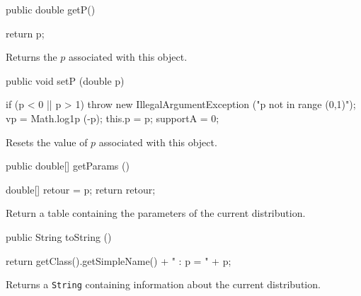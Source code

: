 \begin{code}

   public double getP()\begin{hide} {
      return p;
   }\end{hide}
\end{code}
\begin{tabb}
   Returns the $p$ associated with this object.
\end{tabb}
\begin{code}

   public void setP (double p)\begin{hide} {
      if (p < 0 || p > 1)
         throw new IllegalArgumentException ("p not in range (0,1)");
      vp = Math.log1p (-p);
      this.p = p;
      supportA = 0;
   }\end{hide}
\end{code}
\begin{tabb}
   Resets the value of $p$ associated with this object.
\end{tabb}
\begin{code}

   public double[] getParams ()\begin{hide} {
      double[] retour = {p};
      return retour;
   }\end{hide}
\end{code}
\begin{tabb}
   Return a table containing the parameters of the current distribution.
\end{tabb}
\begin{hide}\begin{code}

   public String toString ()\begin{hide} {
      return getClass().getSimpleName() + " : p = " + p;
   }\end{hide}
\end{code}
\begin{tabb}
   Returns a \texttt{String} containing information about the current distribution.
\end{tabb}\end{hide}
\begin{code}\begin{hide}
}\end{hide}
\end{code}
